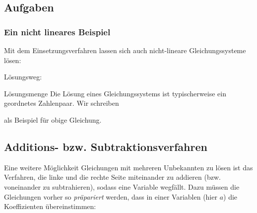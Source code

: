 \subsection*{Aufgaben}

\newpage
  
\subsubsection{Ein nicht lineares Beispiel}
Mit dem Einsetzungsverfahren lassen sich auch nicht-lineare
Gleichungssysteme lösen:

Lösungsweg:

  \begin{gesetz}{Lösungsmenge}{}
    Die Lösung eines Gleichungssystems ist typischerweise ein
    geordnetes Zahlenpaar. Wir schreiben 


  als Beispiel für obige Gleichung.
    
    \end{gesetz}

  \newpage
  
\subsection{Additions- bzw. Subtraktionsverfahren}
Eine weitere Möglichkeit Gleichungen mit mehreren Unbekannten zu lösen ist das Verfahren, die linke und die rechte Seite miteinander zu addieren (bzw. voneinander zu subtrahieren), sodass eine Variable wegfällt. Dazu müssen die Gleichungen vorher so \textit{präpariert} werden, dass in einer Variablen (hier \zB $a$) die Koeffizienten übereinstimmen:

